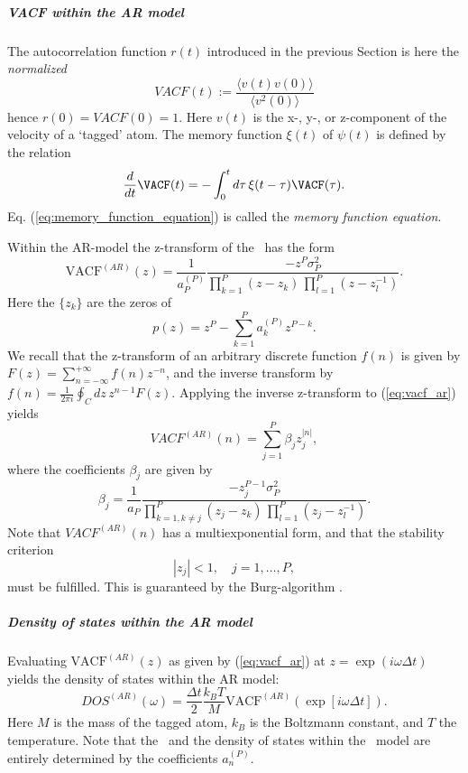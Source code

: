\documentclass[a4paper,11pt]{report}
\begin{document}
\subparagraph{VACF within the AR model} The autocorrelation function $r(t)$ introduced in the previous Section is here 
the \emph{normalized} \VACF 
\begin{equation}
VACF(t) := \frac{\langle v(t)v(0)\rangle}{\langle v^2(0)\rangle}
\end{equation}
hence $r(0)=VACF(0)=1$. 
Here $v(t)$ is the x-, y-, or z-component of the velocity of a `tagged' atom. 
The memory function $\xi(t)$ of $\psi(t)$ is defined by the relation
\begin{equation}
\label{eq:memory_function_equation}
\frac{d}{dt}\VACF(t) = -\int_{0}^{t}d\tau\, \xi(t-\tau)\VACF(\tau).
\end{equation}
Eq. (\ref{eq:memory_function_equation}) is called the {\em memory function equation}. 

Within the AR-model the z-transform of the \VACF\ has the form
\begin{equation}
\label{eq:vacf_ar}
\mathrm{VACF}^{(AR)}(z) = \frac{1}{a^{(P)}_P}\frac{-z^P\sigma_P^2}
{\prod_{k=1}^P (z-z_k)\,\prod_{l=1}^P(z-z^{-1}_l)}.
\end{equation}
Here the $\{z_k\}$ are the zeros of
\begin{equation}
\label{eq:p_z}
p(z) = z^P-\sum_{k=1}^{P}a^{(P)}_k z^{P-k}.
\end{equation}
We recall that the z-transform of an arbitrary discrete function $f(n)$ is given by 
$F(z) = \sum_{n=-\infty}^{+\infty} f(n) z^{-n}$, and the inverse transform by $f(n)  = \frac{1}{2\pi i}\oint_C dz\,z^{n-1} 
F(z)$. Applying the inverse z-transform to (\ref{eq:vacf_ar}) yields
\begin{equation}
\label{eq:psi_n}
VACF^{(AR)}(n) = \sum_{j=1}^{P}\beta_jz_j^{|n|},
\end{equation}
where the coefficients $\beta_j$ are given by
\begin{equation}
\label{eq:beta_j}
\beta_j = \frac{1}{a_P}\frac{-z_j^{P-1}\sigma_P^2}
{\prod_{k=1,k\ne j}^P (z_j-z_k)\,\prod_{l=1}^P(z_j-z^{-1}_l)}.
\end{equation}
Note that $VACF^{(AR)}(n)$ has a multiexponential form, and that the stability criterion
\begin{equation}
\label{eq:stability}
|z_j| < 1,\quad j=1,\ldots,P,
\end{equation}
must be fulfilled. This is guaranteed by the Burg-algorithm \cite{Burg,Makhoul:1977}. 

\subparagraph{Density of states within the AR model} Evaluating $\mathrm{VACF}^{(AR)}(z)$ as given by (\ref{eq:vacf_ar}) at
$z=\exp(i\omega\Delta t)$ yields the density of states within the AR
model:
\begin{equation}
DOS^{(AR)}(\omega)=\frac{\Delta t}{2}\frac{k_BT}{M} \mathrm{VACF}^{(AR)}
\left(\exp[i\omega\Delta t]\right).
\end{equation}
Here $M$ is the mass of the tagged atom, $k_B$ is the Boltzmann constant, and $T$ the temperature. Note that the \VACF\ and 
the density of states within the \AR\ model are entirely determined by the coefficients $a^{(P)}_n$.
\end{document}

